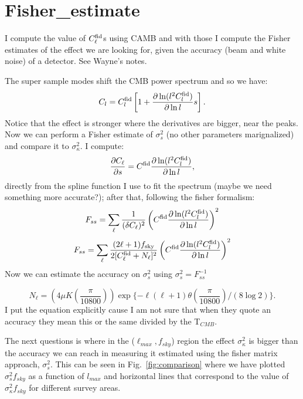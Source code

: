 \documentclass[prd,onecolumn,amsmath,amssymb,floatfix,superscriptaddress,notitlepage]{revtex4-1}
\def\be{\begin{equation}}
\def\ee{\end{equation}}
\def\ben{\begin{equation*}}
\def\een{\end{equation*}}
\newcommand{\reffig}[1]{Fig.~\ref{fig:#1}}
\begin{document}
\section{Fisher\_estimate}

I compute the value of  $C^{\rm{fid}}_{\ell}$s using CAMB and with those I compute the Fisher estimates of the effect we are looking for, given the accuracy (beam and white noise) of a detector. See Wayne's notes.

The super sample modes shift the CMB power spectrum and so we have:
\begin{equation}\label{eqn:Cfiducial}
C_l = C_l^{\rm fid} \left[ 1+ \frac{\partial \ln (l^2 C_l^{\rm fid} )}{\partial \ln l} s \right].
\end{equation}
Notice that the effect is stronger where the derivatives are bigger, near the peaks.
Now we can perform a Fisher estimate of $\sigma_s^2$ (no other parameters marignalized) and compare it to $\sigma_\kappa^2$.  
I compute:
\begin{equation}
\frac{\partial C_{\ell}}{\partial s}=C^{\rm fid}\frac{\partial \ln (l^2 C_l^{\rm fid}) }{\partial \ln l},
\end{equation}
directly from the spline function I use to fit the spectrum (maybe we need something more accurate?); after that, following the fisher formalism:
\ben
F_{ss}=\sum_{\ell}\frac{1}{(\delta C_{\ell})^{2}}\left( C^{\rm fid}\frac{\partial \ln (l^2 C_l^{\rm fid} )}{\partial \ln l}\right)^{2}
\een
\ben
F_{ss}=\sum_{\ell}\frac{(2\ell+1)f_{\rm sky}}{2[C^{\rm{fid}}_{\ell}+N_{\ell}]^{2}}\left( C^{\rm fid}\frac{\partial \ln (l^2 C_l^{\rm fid} )}{\partial \ln l}\right)^{2}
\een
Now we can estimate the accuracy on $\sigma_{s}^{2}$ using $\sigma_{s}^{2}=F_{ss}^{-1}$

\be
N_{\ell}=\left( 4 \mu K \left(\frac{\pi}{10800}\right)\right)\exp\{-\ell(\ell+1)\theta\left(\frac{\pi}{10800}\right)/(8\log 2)\}.
\ee
I put the equation explicitly cause I am not sure that when they quote an accuracy they mean this or the same divided by the T$_{CMB}$.

The next questions is where in the ($\ell_{max},f_{sky}$) region the effect $\sigma_{\kappa}^{2}$ is bigger than the accuracy we can reach in measuring it estimated using the fisher matrix approach, $\sigma_{s}^{2}$.
This can be seen in \reffig{comparison} where we have plotted $\sigma_{s}^{2}f_{sky}$ as a function of $l_{max}$ and horizontal lines that correspond to the value of $\sigma_{\kappa}^{2}f_{sky}$ for different survey areas.
\end{document}
